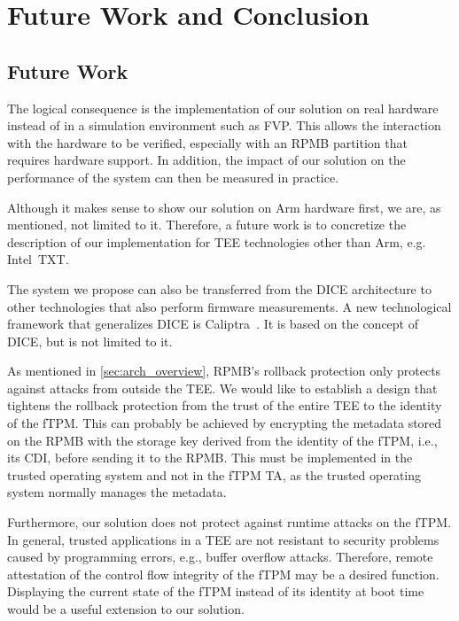 
\chapter{Future Work and Conclusion}\label{chapter:future_work_and_conclusion}

\section{Future Work}

The logical consequence is the implementation of our solution on real hardware instead of in a simulation environment such as FVP\@.
This allows the interaction with the hardware to be verified, especially with an RPMB partition that requires hardware support.
In addition, the impact of our solution on the performance of the system can then be measured in practice.

Although it makes sense to show our solution on Arm hardware first, we are, as mentioned, not limited to it.
Therefore, a future work is to concretize the description of our implementation for TEE technologies other than Arm, e.g. Intel~TXT\@.

The system we propose can also be transferred from the DICE architecture to other technologies that also perform firmware measurements.
A new technological framework that generalizes DICE is Caliptra~\cite{caliptra}.
It is based on the concept of DICE, but is not limited to it.

As mentioned in \autoref{sec:arch_overview}, RPMB's rollback protection only protects against attacks from outside the TEE\@.
We would like to establish a design that tightens the rollback protection from the trust of the entire TEE to the identity of the fTPM\@.
This can probably be achieved by encrypting the metadata stored on the RPMB with the storage key derived from the identity of the fTPM, i.e., its CDI, before sending it to the RPMB\@.
This must be implemented in the trusted operating system and not in the fTPM TA, as the trusted operating system normally manages the metadata.

Furthermore, our solution does not protect against runtime attacks on the fTPM\@.
In general, trusted applications in a TEE are not resistant to security problems caused by programming errors, e.g., buffer overflow attacks.
Therefore, remote attestation of the control flow integrity of the fTPM may be a desired function.
Displaying the current state of the fTPM instead of its identity at boot time would be a useful extension to our solution.


